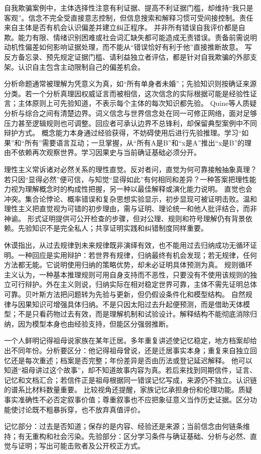 自我欺骗案例中，主体选择性注意有利证据、提高不利证据门槛，却维持“我只是客观”。信念不完全受直接意志控制，但信息搜索和解释习惯可受间接控制。责任来自主体是否有机会认识偏差并建立纠正程序。 并非所有错误自我评价都是自欺。能力有限、情绪识别困难或社会词汇缺失都可能造成无责错误。责备前需说明动机性偏差如何影响证据处理，而不能从“错误恰好有利于他”直接推断故意。 写反方备忘录、预先规定证据门槛、请利益独立者评估，都是针对自我欺骗的外部支架。认识自主包含主动限制自己的偏差机会。

分析命题通常被理解为凭意义为真，如“所有单身者未婚”；先验知识则按确证来源分类。若一个分析真理因权威证言而被相信，这次信念的实际根据可能是经验性证言；主体原则上可先验知道，不表示每个主体的每次知识都先验。 Quine等人质疑分析与综合之间有清楚边界。词义信念与世界信念处在同一可修正网络，面对足够压力甚至逻辑规则也可调整。回应者可承认边界不总锋利，却保留典型案例中不同辩护方式。 概念能力本身通过经验获得，不妨碍使用后进行先验推理。学习“如果”和“所有”需要语言互动；一旦掌握，从“所有A是B”和“x是A”推出“x是B”的理由不依赖再次观察世界。学习因果史与当前确证基础必须分开。

理性主义常诉诸对必然关系的理性直觉\parencite{bonjour1998}。反对者问，直觉为何可靠接触抽象真理？若只因“显得必然”便可信，与知觉“显得如此”有何相同和差异？一种答案把理性能力视为理解概念时的构成性把握，另一种以最佳解释或演化能力说明。 直觉也会冲突。集合论悖论、概率错误和复杂思想实验显示，初步显现可被证明击败。温和理性主义把直觉视为可错的初步理由，需与证明、理论统一和他人批评结合，而非神谕。 形式证明提供可公开检查的步骤，但对公理、规则和符号理解仍有背景依赖。先验知识不是完全私人；共享证明实践和纠错制度同样重要。

休谟指出，从过去规律到未来规律既非演绎有效，也不能用过去归纳成功无循环证明\parencite{hume2000}。一种回应是实用辩护：若世界有规律，归纳最终有机会发现；若无规律，任何方法都无能。它说明使用归纳的策略优势，却未必证明具体预测为真。 规则循环主义认为，一种基本推理规则可用自身支持而不恶性，只要没有不使用该规则的独立可行辩护。外在主义则说，归纳实际在相对稳定世界可靠，主体不需先证明总体可靠。贝叶斯方法把问题转为先验与更新，但仍假设条件化和模型结构。 自然规律与因果知识可增强具体归纳。不是只因太阳过去升起便预测，而是借助天体模型；不是只看药物过去有效，而是理解机制和试验设计。解释结构不能彻底消除归纳，因为模型本身也由经验支持，但能区分强弱推断。

一个人鲜明记得祖母说家族在某年迁居。多年重复讲述使记忆稳定，地方档案却给出不同年份。分析要区分：他记得祖母曾说，还是迁居事实本身；重复来自独立回忆还是每次重述；档案是否完整；年份差异是否由历法或登记延迟解释。 他可以知道“祖母讲过这个故事”，却不知道故事内容为真。若后来找到同期信件，证言、记忆和文档汇合；若信件正是祖母根据同一错误记忆写成，来源仍不独立。认识链的谱系比材料数量重要。 比较视角还提醒，家族记忆承担身份和伦理功能。质疑事实准确性不必否定叙事价值；尊重叙事也不应把象征意义当作历史证据。区分功能使讨论既不粗暴拆穿，也不放弃真值评价。

\begin{tcolorbox}[breakable,colback=white,colframe=blue!30!black,title={记忆与先验分析表},fonttitle=\bfseries]
记忆部分：过去是否知道；保存的是内容、经验还是来源；当前信念由何链条维持；有无重构和社会污染。先验部分：区分学习条件与确证基础、分析与必然、直觉与证明；写出可能击败者及公开校正方式。
\end{tcolorbox}
